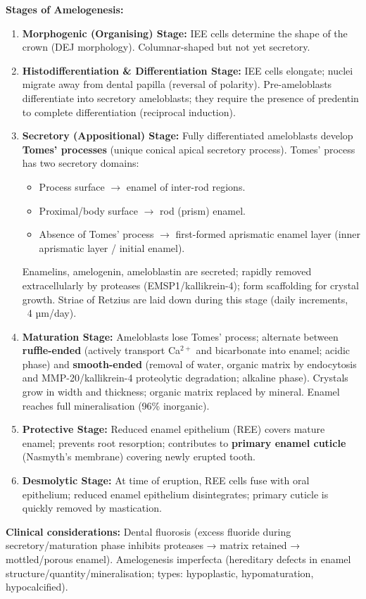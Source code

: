\documentclass[11pt,a4paper]{article}
\begin{document}
\begin{ansbox}
\textbf{Stages of Amelogenesis:}
\begin{enumerate}[leftmargin=*]
    \item \textbf{Morphogenic (Organising) Stage:} IEE cells determine the shape of the crown (DEJ morphology). Columnar-shaped but not yet secretory.
    \item \textbf{Histodifferentiation \& Differentiation Stage:} IEE cells elongate; nuclei migrate away from dental papilla (reversal of polarity). Pre-ameloblasts differentiate into secretory ameloblasts; they require the presence of predentin to complete differentiation (reciprocal induction).
    \item \textbf{Secretory (Appositional) Stage:} Fully differentiated ameloblasts develop \textbf{Tomes' processes} (unique conical apical secretory process). Tomes' process has two secretory domains:
    \begin{itemize}
        \item Process surface $\rightarrow$ enamel of inter-rod regions.
        \item Proximal/body surface $\rightarrow$ rod (prism) enamel.
        \item Absence of Tomes' process $\rightarrow$ first-formed aprismatic enamel layer (inner aprismatic layer / initial enamel).
    \end{itemize}
    Enamelins, amelogenin, ameloblastin are secreted; rapidly removed extracellularly by proteases (EMSP1/kallikrein-4); form scaffolding for crystal growth. Striae of Retzius are laid down during this stage (daily increments, ~4 µm/day).
    \item \textbf{Maturation Stage:} Ameloblasts lose Tomes' process; alternate between \textbf{ruffle-ended} (actively transport Ca$^{2+}$ and bicarbonate into enamel; acidic phase) and \textbf{smooth-ended} (removal of water, organic matrix by endocytosis and MMP-20/kallikrein-4 proteolytic degradation; alkaline phase). Crystals grow in width and thickness; organic matrix replaced by mineral. Enamel reaches full mineralisation (96\% inorganic).
    \item \textbf{Protective Stage:} Reduced enamel epithelium (REE) covers mature enamel; prevents root resorption; contributes to \textbf{primary enamel cuticle} (Nasmyth's membrane) covering newly erupted tooth.
    \item \textbf{Desmolytic Stage:} At time of eruption, REE cells fuse with oral epithelium; reduced enamel epithelium disintegrates; primary cuticle is quickly removed by mastication.
\end{enumerate}

\textbf{Clinical considerations:} Dental fluorosis (excess fluoride during secretory/maturation phase inhibits proteases → matrix retained → mottled/porous enamel). Amelogenesis imperfecta (hereditary defects in enamel structure/quantity/mineralisation; types: hypoplastic, hypomaturation, hypocalcified).
\end{ansbox}
\end{document}
